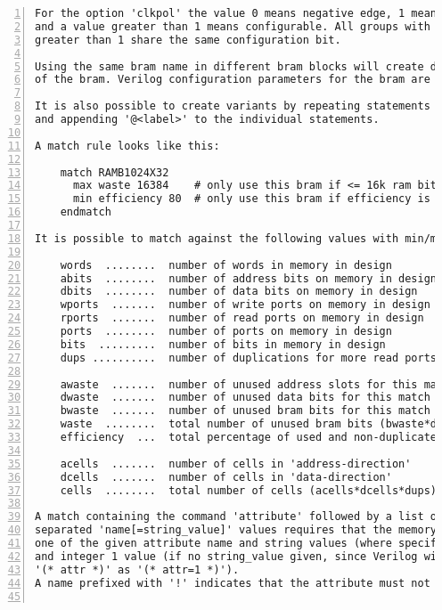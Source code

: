 \begin{lstlisting}[numbers=left,frame=single]
For the option 'clkpol' the value 0 means negative edge, 1 means positive edge
and a value greater than 1 means configurable. All groups with the same value
greater than 1 share the same configuration bit.

Using the same bram name in different bram blocks will create different variants
of the bram. Verilog configuration parameters for the bram are created as needed.

It is also possible to create variants by repeating statements in the bram block
and appending '@<label>' to the individual statements.

A match rule looks like this:

    match RAMB1024X32
      max waste 16384    # only use this bram if <= 16k ram bits are unused
      min efficiency 80  # only use this bram if efficiency is at least 80%
    endmatch

It is possible to match against the following values with min/max rules:

    words  ........  number of words in memory in design
    abits  ........  number of address bits on memory in design
    dbits  ........  number of data bits on memory in design
    wports  .......  number of write ports on memory in design
    rports  .......  number of read ports on memory in design
    ports  ........  number of ports on memory in design
    bits  .........  number of bits in memory in design
    dups ..........  number of duplications for more read ports

    awaste  .......  number of unused address slots for this match
    dwaste  .......  number of unused data bits for this match
    bwaste  .......  number of unused bram bits for this match
    waste  ........  total number of unused bram bits (bwaste*dups)
    efficiency  ...  total percentage of used and non-duplicated bits

    acells  .......  number of cells in 'address-direction'
    dcells  .......  number of cells in 'data-direction'
    cells  ........  total number of cells (acells*dcells*dups)

A match containing the command 'attribute' followed by a list of space
separated 'name[=string_value]' values requires that the memory contains any
one of the given attribute name and string values (where specified), or name
and integer 1 value (if no string_value given, since Verilog will interpret
'(* attr *)' as '(* attr=1 *)').
A name prefixed with '!' indicates that the attribute must not exist.


\end{lstlisting}
